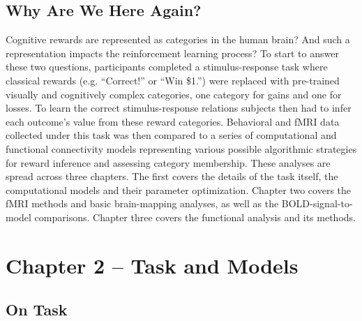 \documentclass[doc,12pt]{apa}        %
\begin{document}
\subsection{Why Are We Here Again?}
\label{sub:goals}
Cognitive rewards are represented as categories in the human brain?  And such a representation impacts the reinforcement learning process?  To start to answer these two questions, participants completed a stimulus-response task where classical rewards (e.g. ``Correct!'' or ``Win \$1.'') were replaced with pre-trained visually and cognitively complex categories, one category for gains and one for losses.  To learn the correct stimulus-response relations subjects then had to infer each outcome's value from these reward categories.   Behavioral and fMRI data collected under this task was then compared to a series of computational and functional connectivity models representing various possible algorithmic strategies for reward inference and assessing category membership.  These analyses are spread across three chapters.  The first covers the details of the task itself, the computational models and their parameter optimization.  Chapter two covers the fMRI methods and basic brain-mapping analyses, as well as the BOLD-signal-to-model comparisons.  Chapter three covers the functional analysis and its methods.

\newpage
\section{Chapter 2 -- Task and Models} %
\label{sec:task_and_models}
\subsection{On Task}
\label{sub:to_task}
\end{document}
